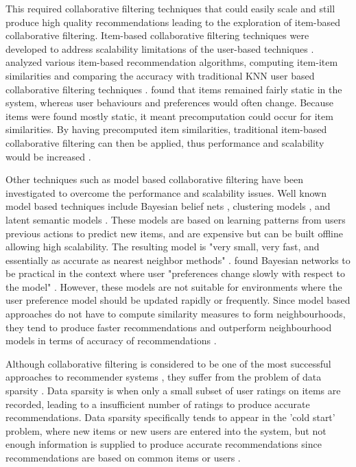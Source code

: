 This required collaborative filtering techniques that could easily scale and still produce high quality recommendations leading to the exploration of item-based collaborative filtering. Item-based collaborative filtering techniques were developed to address scalability limitations of the user-based techniques \cite{survey}. \citeauthor{itembased} analyzed various item-based recommendation algorithms, computing item-item similarities and comparing the accuracy with traditional KNN user based collaborative filtering techniques \cite{itembased}. \citeauthor{itembased} found that items remained fairly static in the system, whereas user behaviours and preferences would often change. Because items were found mostly static, it meant precomputation could occur for item similarities. By having precomputed item similarities, traditional item-based collaborative filtering can then be applied, thus performance and scalability would be increased \cite{scalable}.

Other techniques such as model based collaborative filtering have been investigated to overcome the performance and scalability issues. Well known model based techniques include Bayesian belief nets \cite{baysian}, clustering models \cite{clustering}, and latent semantic models \cite{latent}. These models are based on learning patterns from users previous actions to predict new items, and are expensive but can be built offline allowing high scalability. The resulting model is "very small, very fast, and essentially as accurate as nearest neighbor methods" \cite{itembased}. \citeauthor{itembased} found Bayesian networks to be practical in the context where user "preferences change slowly with respect to the model" \cite{itembased}. However, these models are not suitable for environments where the user preference model should be updated rapidly or frequently. Since model based approaches do not have to compute similarity measures to form neighbourhoods, they tend to produce faster recommendations and outperform neighbourhood models in terms of accuracy of recommendations \cite{toward, itembased}. 

Although collaborative filtering is considered to be one of the most successful approaches to recommender systems \cite{survey, toward}, they suffer from the problem of data sparsity \cite{toward, survey, itembased, koren2009matrix, koren2011, dimension}. Data sparsity is when only a small subset of user ratings on items are recorded, leading to a insufficient number of ratings to produce accurate recommendations. Data sparsity specifically tends to appear in the 'cold start' problem, where new items or new users are entered into the system, but not enough information is supplied to produce accurate recommendations since recommendations are based on common items or users \cite{survey}.

